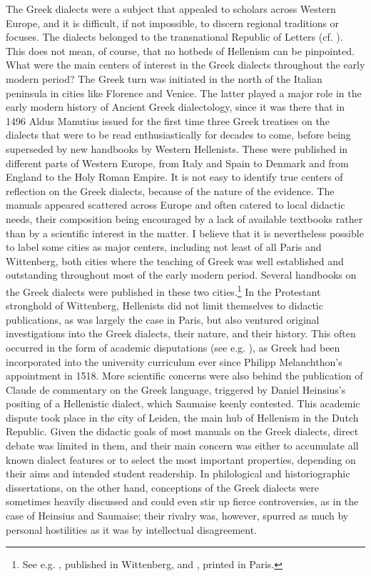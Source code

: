 The Greek dialects were a subject that appealed to scholars across Western Europe, and it is difficult, if not impossible, to discern regional traditions or focuses. The dialects belonged to the transnational Republic of Letters (cf. \citealt{Bots1997}). This does not mean, of course, that no hotbeds of Hellenism can be pinpointed. What were the main centers of interest in the Greek dialects throughout the early modern period? The Greek turn was initiated in the north of the Italian peninsula in cities like Florence and Venice. The latter played a major role in the early modern history of Ancient Greek dialectology, since it was there that in 1496 Aldus Manutius issued for the first time three Greek treatises on the dialects that were to be read enthusiastically for decades to come, before being superseded by new handbooks by Western Hellenists. These were published in different parts of Western Europe, from Italy and Spain to Denmark and from England to the Holy Roman Empire. It is not easy to identify true centers of reflection on the Greek dialects, because of the nature of the evidence. The manuals appeared scattered across Europe and often catered to local didactic needs, their composition being encouraged by a lack of available textbooks rather than by a scientific interest in the matter. I believe that it is nevertheless possible to label some cities as major centers, including not least of all Paris and Wittenberg, both cities where the teaching of Greek was well established and outstanding throughout most of the early modern period. Several handbooks on the Greek dialects were published in these two cities.\footnote{See e.g. \citet{Schmidt1604}, published in Wittenberg, and \citet{Merigon1621}, printed in Paris.} In the Protestant stronghold of Wittenberg, Hellenists did not limit themselves to didactic publications, as was largely the case in Paris, but also ventured original investigations into the Greek dialects, their nature, and their history. This often occurred in the form of academic disputations (see e.g. \citealt{Thryllitsch1709}), as Greek had been incorporated into the university curriculum ever since Philipp Melanchthon’s appointment in 1518. More scientific concerns were also behind the publication of Claude de  commentary on the Greek language, triggered by Daniel Heinsius’s positing of a Hellenistic dialect, which Saumaise keenly contested. This academic dispute took place in the city of Leiden, the main hub of Hellenism in the Dutch Republic. Given the didactic goals of most manuals on the Greek dialects, direct debate was limited in them, and their main concern was either to accumulate all known dialect features or to select the most important properties, depending on their aims and intended student readership. In philological and historiographic dissertations, on the other hand, conceptions of the Greek dialects were sometimes heavily discussed and could even stir up fierce controversies, as in the case of Heinsius and Saumaise; their rivalry was, however, spurred as much by personal hostilities as it was by intellectual disagreement.

